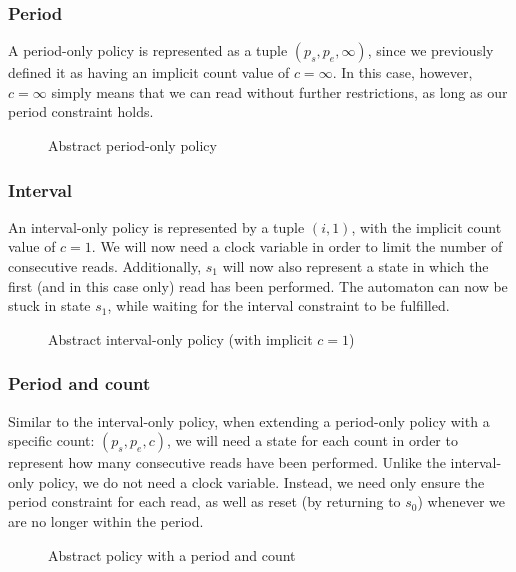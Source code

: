 \subsubsection{Period}
A period-only policy is represented as a tuple $(p_s, p_e, \infty)$, since we previously defined it as having an implicit count value of $c = \infty$.
In this case, however, $c = \infty$ simply means that we can read without further restrictions, as long as our period constraint holds.

\begin{figure}[H]
  \centering
  
  \caption{Abstract period-only policy}
\end{figure}

\subsubsection{Interval}
An interval-only policy is represented by a tuple $(i, 1)$, with the implicit count value of $c = 1$.
We will now need a clock variable in order to limit the number of consecutive reads.
Additionally, $s_1$ will now also represent a state in which the first (and in this case only) read has been performed.
The automaton can now be stuck in state $s_1$, while waiting for the interval constraint to be fulfilled.

\begin{figure}[H]
  \centering
  
  \caption{Abstract interval-only policy (with implicit $c = 1$)}
\end{figure}

\subsubsection{Period and count}
Similar to the interval-only policy, when extending a period-only policy with a specific count: $(p_s, p_e, c)$, we will need a state for each count in order to represent how many consecutive reads have been performed.
Unlike the interval-only policy, we do not need a clock variable.
Instead, we need only ensure the period constraint for each read, as well as reset (by returning to $s_0$) whenever we are no longer within the period.

\begin{figure}[H]
  \centering
  
  \caption{Abstract policy with a period and count}
\end{figure}

